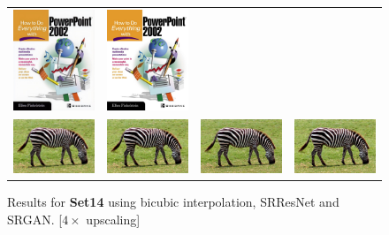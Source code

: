 \documentclass[10pt,twocolumn,letterpaper]{article}
\begin{document}
\begin{figure}[h!]
\begin{tabular}{cccc}
\includegraphics[width=1.5in]{images/used/appendix/jpg/Set14/ppt3_SRGAN-VGG54} &
\includegraphics[width=1.5in]{images/used/appendix/jpg/Set14/ppt3_HR} \\
\includegraphics[width=1.5in]{images/used/appendix/jpg/Set14/zebra_bicubic}&
\includegraphics[width=1.5in]{images/used/appendix/jpg/Set14/zebra_SRResNet-MSE} &
\includegraphics[width=1.5in]{images/used/appendix/jpg/Set14/zebra_SRGAN-VGG54} &
\includegraphics[width=1.5in]{images/used/appendix/jpg/Set14/zebra_HR} \\
\end{tabular}
\label{fig:app_Set14c}
\caption{Results for \textbf{Set14} using bicubic interpolation, SRResNet and SRGAN. [$4\times$ upscaling]}
\end{figure}
\clearpage
\end{document}
